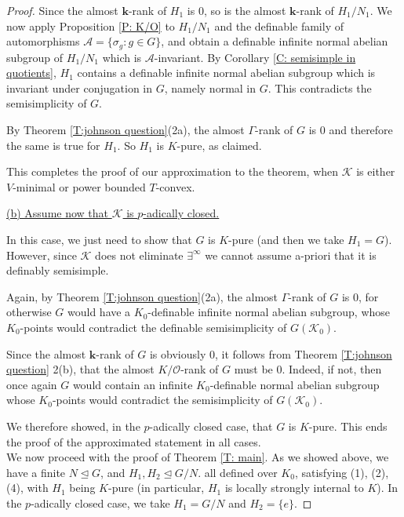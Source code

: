 \documentclass[11pt]{amsart}
\theoremstyle{definition}
\newcommand{\CA}{\mathcal A}
\newcommand{\bk}{\textbf{k}}
\newcommand{\CK}{{\mathcal K}}
\newcommand{\CO}{{\mathcal O}}
\newcommand{\0}{\emptyset}
\newenvironment{claimproof}[1][\proofname]
  {%
    \proof[#1]%
      \renewcommand*\qedsymbol{$\square$ (claim)}%
  }
  {%
    \endproof%
  }
\begin{document}
\begin{proof}
\begin{claimproof}
Since the almost $\bk$-rank of $H_1$ is $0$, so  is the almost $\bk$-rank of $H_1/N_1$.
  We now apply Proposition \ref{P: K/O} to $H_1/N_1$ and the definable  family of automorphisms $\CA=\{\sigma_g:g\in G\}$, and obtain a definable infinite normal abelian subgroup of $H_1/N_1$ which is $\CA$-invariant. By Corollary \ref{C: semisimple in quotients}, $H_1$ contains a definable infinite normal abelian subgroup which is invariant under conjugation in $G$, namely normal in $G$. This contradicts the semisimplicity of $G$.
\end{claimproof}



By Theorem \ref{T:johnson question}(2a), the almost $\Gamma$-rank of  $G$ is $0$ and therefore the same is true for $H_1$. So $H_1$ is $K$-pure, as claimed.

This completes the proof of our approximation to the theorem, when $\CK$ is either $V$-minimal or power bounded $T$-convex.

\underline{(b) Assume now that $\CK$ is $p$-adically closed.}

\vspace{.2cm}

In this case, we just need to show that $G$ is $K$-pure (and then we take $H_1=G$). However, since $\CK$ does not eliminate $\exists^\infty$ we cannot assume a-priori that it is definably semisimple. 

Again, by Theorem \ref{T:johnson question}(2a), the almost $\Gamma$-rank of $G$ is $0$, for otherwise $G$ would have a $K_0$-definable infinite normal abelian subgroup, whose $K_0$-points would contradict the definable semisimplicity of $G(\CK_0)$. 

Since the almost $\bk$-rank of $G$ is obviously $0$, it follows from Theorem \ref{T:johnson question} 2(b), that the almost $K/\CO$-rank of $G$ must be $0$. Indeed, if not, then once again $G$ would contain an infinite $K_0$-definable normal abelian subgroup whose $K_0$-points would contradict the semisimplicity of $G(\CK_0)$.

We therefore showed, in the $p$-adically closed case, that $G$ is $K$-pure. This ends the proof of the approximated statement in all cases.
\\

We now proceed with the proof of Theorem \ref{T: main}. As we showed above, we have a finite $N\trianglelefteq G$, and  $H_1, H_2\trianglelefteq G/N$. all defined over $K_0$, satisfying (1), (2), (4), with $H_1$ being $K$-pure (in particular, $H_1$ is locally strongly internal to $K$). In the $p$-adically closed case, we take $H_1=G/N$ and $H_2=\{e\}$.


\end{proof}
\end{document}
